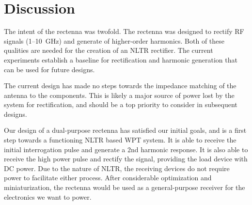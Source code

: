 \section{Discussion}
\label{sec:rectenna-discussion}

The intent of the rectenna was twofold. The rectenna was designed to rectify RF signals (\numrange{1}{10}~GHz) and generate of higher-order harmonics. Both of these qualities are needed for the creation of an NLTR rectifier. The current experiments establish a baseline for rectification and harmonic generation that can be used for future designs.

The current design has made no steps towards the impedance matching of the antenna to the components. This is likely a major source of power lost by the system for rectification, and should be a top priority to consider in subsequent designs.

Our design of a dual-purpose rectenna has satisfied our initial goals, and is a first step towards a functioning NLTR based WPT system.  It is able to receive the initial interrogation pulse and generate a 2nd harmonic response. It is also able to receive the high power pulse and rectify the signal, providing the load device with DC power. Due to the nature of NLTR, the receiving devices do not require power to facilitate either process. After considerable optimization and miniaturization, the rectenna would be used as a general-purpose receiver for the electronics we want to power.
